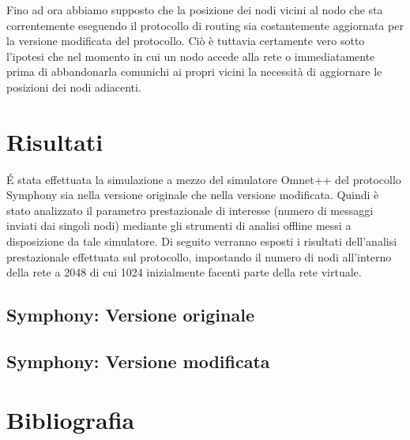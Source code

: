 \documentclass[	
	DIV=calc,
	paper=a4,
	fontsize=11pt,
	onecolumn
]{scrartcl} %
\begin{document}
Fino ad ora abbiamo supposto che la posizione dei nodi vicini al nodo che sta correntemente eseguendo il protocollo di routing sia costantemente aggiornata per la versione modificata del protocollo. Ciò è tuttavia certamente vero sotto l'ipotesi che nel momento in cui un nodo accede alla rete o immediatamente prima di abbandonarla comunichi ai propri vicini la necessità di aggiornare le posizioni dei nodi adiacenti. 
\section{Risultati}
\'E stata effettuata la simulazione a mezzo del simulatore Omnet++ del protocollo Symphony sia nella versione originale che nella versione modificata. Quindi è stato analizzato il parametro prestazionale di interesse (numero di messaggi inviati dai singoli nodi) mediante gli strumenti di analisi offline messi a disposizione da tale simulatore. Di seguito verranno esposti i risultati dell'analisi prestazionale effettuata sul protocollo, impostando il numero di nodi all'interno della rete a 2048 di cui 1024 inizialmente facenti parte della rete virtuale.
\subsection{Symphony: Versione originale}



\subsection{Symphony: Versione modificata}

\section{Bibliografia}
\end{document}
